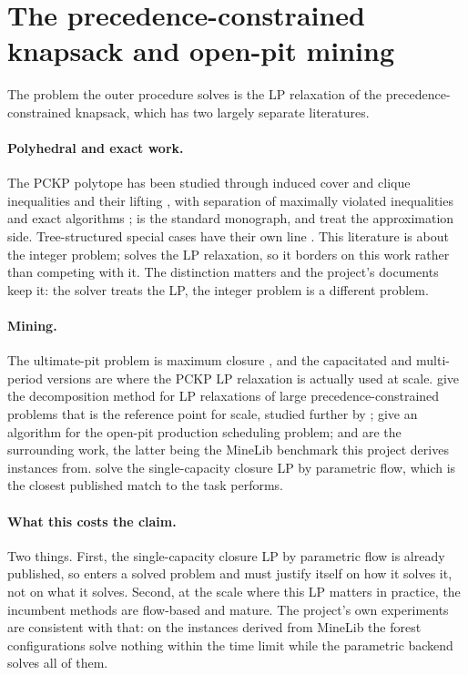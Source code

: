 \section{The precedence-constrained knapsack and open-pit mining}\label{sec:pckp}

The problem the outer procedure solves is the LP relaxation of the
precedence-constrained knapsack, which has two largely separate literatures.

\paragraph{Polyhedral and exact work.} The PCKP polytope has been studied
through induced cover and clique inequalities and their lifting
\citep{Boyd1993,ParkPark1997,VanDeLeenselEtAl1999}, with separation of maximally
violated inequalities \citep{ChoShaw1997,ShawCho1998} and exact algorithms
\citep{SamphaiboonYamada2000}; \citet{KellererEtAl2004} is the standard
monograph, and \citet{KolliopoulosSteiner2007} treat the approximation side.
Tree-structured special cases have their own line
\citep{Johnson1968,Horn1972,AdolphsonHu1973}. This literature is about the
integer problem; \FS{} solves the LP relaxation, so it borders on this work
rather than competing with it. The distinction matters and the project's
documents keep it: the solver treats the LP, the integer problem is a different
problem.

\paragraph{Mining.} The ultimate-pit problem is maximum closure
\citep{LerchsGrossmann1965,Matheron1975a,Vallet1976}, and the capacitated and
multi-period versions are where the PCKP LP relaxation is actually used at
scale. \citet{BienstockZuckerberg2010} give the decomposition method for LP
relaxations of large precedence-constrained problems that is the reference point
for scale, studied further by \citet{MunozEtAl2018};
\citet{ChicoisneEtAl2012} give an algorithm for the open-pit production
scheduling problem; \citet{BolandEtAl2012} and \citet{EspinozaEtAl2015} are the
surrounding work, the latter being the MineLib benchmark this project derives
instances from. \citet{ByunDimitrakopoulos2013} solve the single-capacity
closure LP by parametric flow, which is the closest published match to the task
\FSC{} performs.

\paragraph{What this costs the claim.} Two things. First, the single-capacity
closure LP by parametric flow is already published, so \FS{} enters a solved
problem and must justify itself on how it solves it, not on what it solves.
Second, at the scale where this LP matters in practice, the incumbent methods
are flow-based and mature. The project's own experiments are consistent with
that: on the instances derived from MineLib the forest configurations solve
nothing within the time limit while the parametric backend solves all of them.
